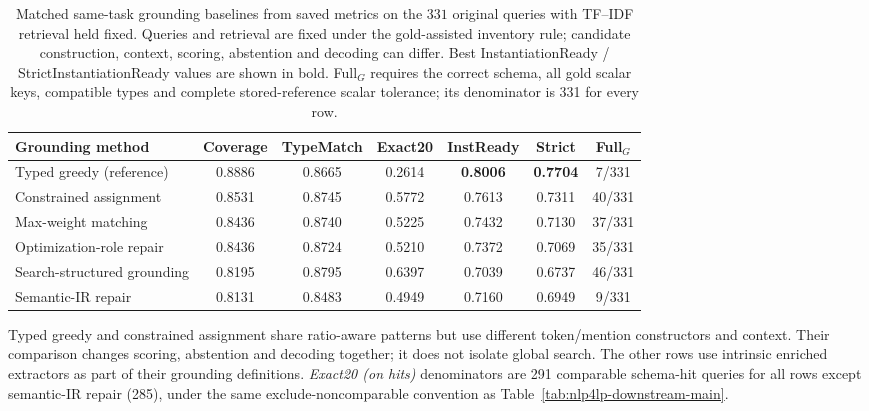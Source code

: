 \documentclass[pdflatex,sn-basic,Numbered]{sn-jnl}
\begin{document}
\begin{table}[t]
  \centering
  \caption{Matched same-task grounding baselines from saved metrics on the $331$ original queries with TF--IDF retrieval held fixed. Queries and retrieval are fixed under the gold-assisted inventory rule; candidate construction, context, scoring, abstention and decoding can differ. Best InstantiationReady / StrictInstantiationReady values are shown in bold. Full$_G$ requires the correct schema, all gold scalar keys, compatible types and complete stored-reference scalar tolerance; its denominator is 331 for every row.}
  \label{tab:nlp4lp-grounding-baselines}
  \scriptsize
  \setlength{\tabcolsep}{2.2pt}
  \renewcommand{\arraystretch}{1.12}
  \begin{tabular}{@{}lcccccc@{}}
    \toprule
    Grounding method & Coverage & TypeMatch & Exact20 & InstReady & Strict & Full$_G$ \\
    \midrule
    Typed greedy (reference) & 0.8886 & 0.8665 & 0.2614 & \textbf{0.8006} & \textbf{0.7704} & 7/331 \\
    Constrained assignment & 0.8531 & 0.8745 & 0.5772 & 0.7613 & 0.7311 & 40/331 \\
    Max-weight matching & 0.8436 & 0.8740 & 0.5225 & 0.7432 & 0.7130 & 37/331 \\
    Optimization-role repair & 0.8436 & 0.8724 & 0.5210 & 0.7372 & 0.7069 & 35/331 \\
    Search-structured grounding & 0.8195 & 0.8795 & 0.6397 & 0.7039 & 0.6737 & 46/331 \\
    Semantic-IR repair & 0.8131 & 0.8483 & 0.4949 & 0.7160 & 0.6949 & 9/331 \\
    \bottomrule
  \end{tabular}

  \vspace{2mm}
  \raggedright
  \footnotesize
  Typed greedy and constrained assignment share ratio-aware patterns but use different token/mention constructors and context. Their comparison changes scoring, abstention and decoding together; it does not isolate global search. The other rows use intrinsic enriched extractors as part of their grounding definitions. \textit{Exact20 (on hits)} denominators are 291 comparable schema-hit queries for all rows except semantic-IR repair (285), under the same exclude-noncomparable convention as Table~\ref{tab:nlp4lp-downstream-main}.
\end{table}
\end{document}
